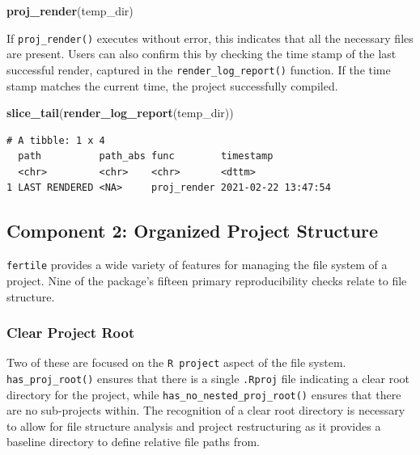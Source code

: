 \documentclass[12pt,twoside]{reedthesis}
\newenvironment{Shaded}{\begin{snugshade}}{\end{snugshade}}
\newcommand{\KeywordTok}[1]{\textcolor[rgb]{0.13,0.29,0.53}{\textbf{#1}}}
\newcommand{\NormalTok}[1]{#1}
\begin{document}
\begin{Shaded}
\begin{Highlighting}[]
\KeywordTok{proj_render}\NormalTok{(temp_dir)}
\end{Highlighting}
\end{Shaded}
If \texttt{proj\_render()} executes without error, this indicates that all the necessary files are present. Users can also confirm this by checking the time stamp of the last successful render, captured in the \texttt{render\_log\_report()} function. If the time stamp matches the current time, the project successfully compiled.
\begin{Shaded}
\begin{Highlighting}[]
\KeywordTok{slice_tail}\NormalTok{(}\KeywordTok{render_log_report}\NormalTok{(temp_dir))}
\end{Highlighting}
\end{Shaded}
\begin{verbatim}
# A tibble: 1 x 4
  path          path_abs func        timestamp          
  <chr>         <chr>    <chr>       <dttm>             
1 LAST RENDERED <NA>     proj_render 2021-02-22 13:47:54
\end{verbatim}
\hypertarget{component-2-organized-project-structure}{%
\subsection{Component 2: Organized Project Structure}\label{component-2-organized-project-structure}}

\texttt{fertile} provides a wide variety of features for managing the file system of a project. Nine of the package's fifteen primary reproducibility checks relate to file structure.

\hypertarget{clear-project-root}{%
\subsubsection{Clear Project Root}\label{clear-project-root}}

Two of these are focused on the \texttt{R\ project} aspect of the file system. \texttt{has\_proj\_root()} ensures that there is a single \texttt{.Rproj} file indicating a clear root directory for the project, while \texttt{has\_no\_nested\_proj\_root()} ensures that there are no sub-projects within. The recognition of a clear root directory is necessary to allow for file structure analysis and project restructuring as it provides a baseline directory to define relative file paths from.
\end{document}

